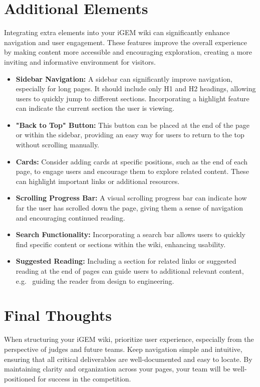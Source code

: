 \section{Additional Elements}
Integrating extra elements into your iGEM wiki can significantly enhance navigation and user engagement.
These features improve the overall experience by making content more accessible and encouraging exploration, creating a more inviting and informative environment for visitors.
\begin{itemize}
\item \textbf{Sidebar Navigation:}
A sidebar can significantly improve navigation, especially for long pages.
It should include only H1 and H2 headings, allowing users to quickly jump to different sections.
Incorporating a highlight feature can indicate the current section the user is viewing.


\item \textbf{"Back to Top" Button:}
This button can be placed at the end of the page or within the sidebar, providing an easy way for users to return to the top without scrolling manually. %

\item \textbf{Cards:}
Consider adding cards at specific positions, such as the end of each page, to engage users and encourage them to explore related content.
These can highlight important links or additional resources.

\item \textbf{Scrolling Progress Bar:}
A visual scrolling progress bar can indicate how far the user has scrolled down the page, giving them a sense of navigation and encouraging continued reading.

\item \textbf{Search Functionality:}
Incorporating a search bar allows users to quickly find specific content or sections within the wiki, enhancing usability.


\item \textbf{Suggested Reading:}
Including a section for related links or suggested reading at the end of pages can guide users to additional relevant content, e.g. \ guiding the reader from design to engineering.
\end{itemize}

\section*{Final Thoughts}
When structuring your iGEM wiki, prioritize user experience, especially from the perspective of judges and future teams.
Keep navigation simple and intuitive, ensuring that all critical deliverables are well-documented and easy to locate.
By maintaining clarity and organization across your pages, your team will be well-positioned for success in the competition.
